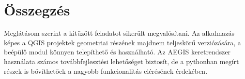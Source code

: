 \chapter{Összegzés}
\label{ch:sum}
Meglátásom szerint a kitűzött feladatot sikerült megvalósítani. Az alkalmazás képes a QGIS projektek geometriai részének majdnem teljeskörű verziózására, a beépülő modul könnyen telepíthető és használható. Az AEGIS keretrendszer használata számos továbbfejlesztési lehetőséget biztosít, de a pythonban megírt részek is bővíthetőek a nagyobb funkcionalitás elérésének érdekében.